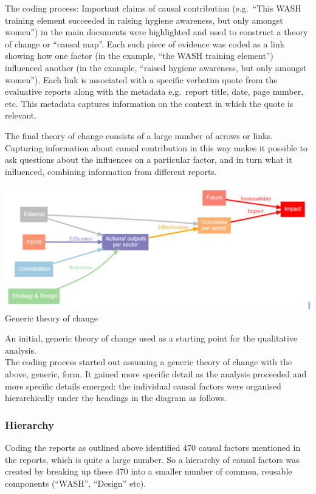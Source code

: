 \documentclass[
]{book}
\begin{document}
The coding process: Important claims of causal contribution (e.g.~``This WASH training
element succeeded in raising hygiene awareness, but only amongst women'') in the main
documents were highlighted and used to construct a theory of change or ``causal map''.
Each such piece of evidence was coded as a link showing how one factor (in the example,
``the WASH training element'') influenced another (in the example, ``raised hygiene
awareness, but only amongst women''). Each link is associated with a specific verbatim
quote from the evaluative reports along with the metadata e.g.~report title, date, page
number, etc. This metadata captures information on the context in which the quote is
relevant.

The final theory of change consists of a large number of arrows or links.\\
Capturing information about causal contribution in this way makes it possible to ask
questions about the influences on a particular factor, and in turn what it influenced,
combining information from different reports.

\includegraphics{_assets/ff6196596cc415b9eec16a64ed3d02bb.png}
Generic theory of change

An initial, generic theory of change used as a starting point for the qualitative analysis.\\
The coding process started out assuming a generic theory of change with the above,
generic, form. It gained more specific detail as the analysis proceeded and more specific
details emerged: the individual causal factors were organised hierarchically under the
headings in the diagram as follows.

\hypertarget{hierarchy}{%
\subsubsection{Hierarchy}\label{hierarchy}}

Coding the reports as outlined above identified 470 causal factors mentioned in the
reports, which is quite a large number. So a hierarchy of causal factors was created by
breaking up these 470 into a smaller number of common, reusable components
(``WASH'', ``Design'' etc).
\end{document}
